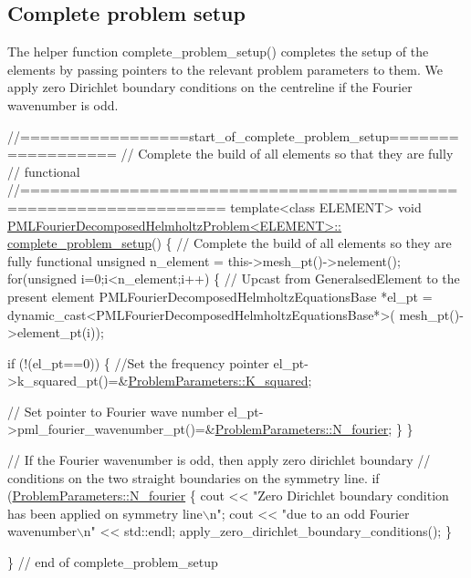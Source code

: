 \hypertarget{index_c_prob_setup}{}\subsection{Complete problem setup}\label{index_c_prob_setup}
The helper function {\ttfamily complete\+\_\+problem\+\_\+setup()} completes the setup of the elements by passing pointers to the relevant problem parameters to them. We apply zero Dirichlet boundary conditions on the centreline if the Fourier wavenumber is odd.

 
\begin{DoxyCodeInclude}
\textcolor{comment}{//=================start\_of\_complete\_problem\_setup==================}
\textcolor{comment}{// Complete the build of all elements so that they are fully}
\textcolor{comment}{// functional}
\textcolor{comment}{//==================================================================}
\textcolor{keyword}{template}<\textcolor{keyword}{class} ELEMENT>
\textcolor{keywordtype}{void} \hyperlink{classPMLFourierDecomposedHelmholtzProblem_aca49343d9672607fdc3ab5f6ed4e9d24}{PMLFourierDecomposedHelmholtzProblem<ELEMENT>::}
\hyperlink{classPMLFourierDecomposedHelmholtzProblem_aca49343d9672607fdc3ab5f6ed4e9d24}{complete\_problem\_setup}()
\{
 \textcolor{comment}{// Complete the build of all elements so they are fully functional}
 \textcolor{keywordtype}{unsigned} n\_element = this->mesh\_pt()->nelement();
 \textcolor{keywordflow}{for}(\textcolor{keywordtype}{unsigned} i=0;i<n\_element;i++)
  \{
   \textcolor{comment}{// Upcast from GeneralsedElement to the present element}
   PMLFourierDecomposedHelmholtzEquationsBase *el\_pt
    = \textcolor{keyword}{dynamic\_cast<}PMLFourierDecomposedHelmholtzEquationsBase*\textcolor{keyword}{>}(
        mesh\_pt()->element\_pt(i));

   \textcolor{keywordflow}{if} (!(el\_pt==0))
    \{
     \textcolor{comment}{//Set the frequency pointer}
     el\_pt->k\_squared\_pt()=&\hyperlink{namespaceProblemParameters_aa5362de1af9e257fde4317c367158a93}{ProblemParameters::K\_squared};

     \textcolor{comment}{// Set pointer to Fourier wave number}
     el\_pt->pml\_fourier\_wavenumber\_pt()=&\hyperlink{namespaceProblemParameters_aaa674958a1ca6ee0b99de3377288c93f}{ProblemParameters::N\_fourier};
    \}
  \}

 \textcolor{comment}{// If the Fourier wavenumber is odd, then apply zero dirichlet boundary}
 \textcolor{comment}{// conditions on the two straight boundaries on the symmetry line.}
 \textcolor{keywordflow}{if} (\hyperlink{namespaceProblemParameters_aaa674958a1ca6ee0b99de3377288c93f}{ProblemParameters::N\_fourier} %
  \{
   cout
    << \textcolor{stringliteral}{"Zero Dirichlet boundary condition has been applied on symmetry line\(\backslash\)n"};
   cout << \textcolor{stringliteral}{"due to an odd Fourier wavenumber\(\backslash\)n"} << std::endl;
   apply\_zero\_dirichlet\_boundary\_conditions();
  \}

\} \textcolor{comment}{// end of complete\_problem\_setup}

\end{DoxyCodeInclude}




